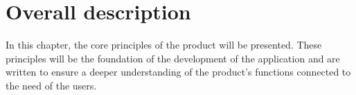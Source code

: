 \section{Overall description}
In this chapter, the core principles of the product will be presented. These principles will be the foundation of the development of the application and are written to ensure a deeper understanding of the product's functions connected to the need of the users.
\newline

\label{sec:overalldescription}

